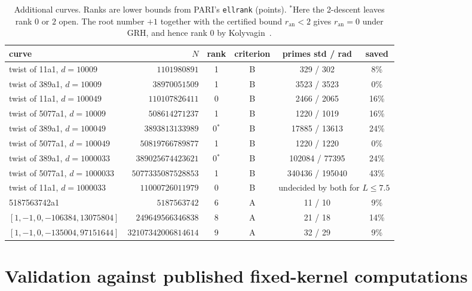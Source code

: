 \documentclass[11pt]{amsart}
\theoremstyle{remark}
\theoremstyle{definition}
\newcommand{\ran}{r_{\mathrm{an}}}
\begin{document}
\begin{table}[h]
\centering\small
\begin{tabular}{lrcccc}
\toprule
curve & $N$ & rank & criterion & primes std / rad & saved\\
\midrule
twist of 11a1, $d=10009$     & $1101980891$         & 1 & B & 329 / 302 & 8\%\\
twist of 389a1, $d=10009$    & $38970051509$        & 1 & B & 3523 / 3523 & 0\%\\
twist of 11a1, $d=100049$    & $110107826411$       & 0 & B & 2466 / 2065 & 16\%\\
twist of 5077a1, $d=10009$   & $508614271237$       & 1 & B & 1220 / 1019 & 16\%\\
twist of 389a1, $d=100049$   & $3893813133989$      & 0$^{\ast}$ & B & 17885 / 13613 & 24\%\\
twist of 5077a1, $d=100049$  & $50819766789877$     & 1 & B & 1220 / 1220 & 0\%\\
twist of 389a1, $d=1000033$  & $389025674423621$    & 0$^{\ast}$ & B & 102084 / 77395 & 24\%\\
twist of 5077a1, $d=1000033$ & $5077335087528853$   & 1 & B & 340436 / 195040 & 43\%\\
twist of 11a1, $d=1000033$   & $11000726011979$     & 0 & B & \multicolumn{2}{c}{undecided by both for $L\le7.5$}\\
\midrule
5187563742a1                 & $5187563742$         & 6 & A & 11 / 10 & 9\%\\
$[1,-1,0,-106384,13075804]$  & $249649566346838$    & 8 & A & 21 / 18 & 14\%\\
$[1,-1,0,-135004,97151644]$  & $32107342006814614$  & 9 & A & 32 / 29 & 9\%\\
\bottomrule
\end{tabular}
\caption{Additional curves. Ranks are lower bounds from PARI's \texttt{ellrank} (points). $^{\ast}$Here the 2-descent leaves rank $0$ or $2$ open. The root number $+1$ together with the certified bound $\ran<2$ gives $\ran=0$ under GRH, and hence rank $0$ by Kolyvagin~\cite{Kolyvagin}.}
\label{tab:big}
\end{table}

\section{Validation against published fixed-kernel computations}\label{sec:valid}
\end{document}

